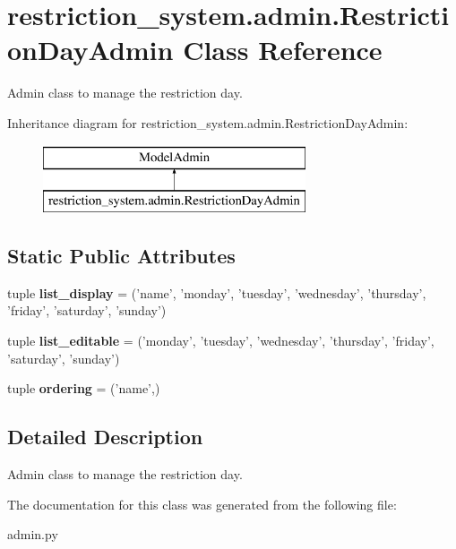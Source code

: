 \hypertarget{classrestriction__system_1_1admin_1_1RestrictionDayAdmin}{}\section{restriction\+\_\+system.\+admin.\+Restriction\+Day\+Admin Class Reference}
\label{classrestriction__system_1_1admin_1_1RestrictionDayAdmin}


Admin class to manage the restriction day.  


Inheritance diagram for restriction\+\_\+system.\+admin.\+Restriction\+Day\+Admin\+:\begin{figure}[H]
\begin{center}
\leavevmode
\includegraphics[height=2.000000cm]{classrestriction__system_1_1admin_1_1RestrictionDayAdmin}
\end{center}
\end{figure}
\subsection*{Static Public Attributes}
\begin{DoxyCompactItemize}
\item 
\hypertarget{classrestriction__system_1_1admin_1_1RestrictionDayAdmin_a01414d36d3f1634148fc898dc012a02c}{}tuple {\bfseries list\+\_\+display} = ('name', 'monday', 'tuesday', 'wednesday', 'thursday', 'friday', 'saturday', 'sunday')\label{classrestriction__system_1_1admin_1_1RestrictionDayAdmin_a01414d36d3f1634148fc898dc012a02c}

\item 
\hypertarget{classrestriction__system_1_1admin_1_1RestrictionDayAdmin_a076054d5efaa3edf4fb34b47f121d723}{}tuple {\bfseries list\+\_\+editable} = ('monday', 'tuesday', 'wednesday', 'thursday', 'friday', 'saturday', 'sunday')\label{classrestriction__system_1_1admin_1_1RestrictionDayAdmin_a076054d5efaa3edf4fb34b47f121d723}

\item 
\hypertarget{classrestriction__system_1_1admin_1_1RestrictionDayAdmin_a25e93917fd109fbbf45b092541f74f68}{}tuple {\bfseries ordering} = ('name',)\label{classrestriction__system_1_1admin_1_1RestrictionDayAdmin_a25e93917fd109fbbf45b092541f74f68}

\end{DoxyCompactItemize}


\subsection{Detailed Description}
Admin class to manage the restriction day. 



The documentation for this class was generated from the following file\+:\begin{DoxyCompactItemize}
\item 
admin.\+py\end{DoxyCompactItemize}
